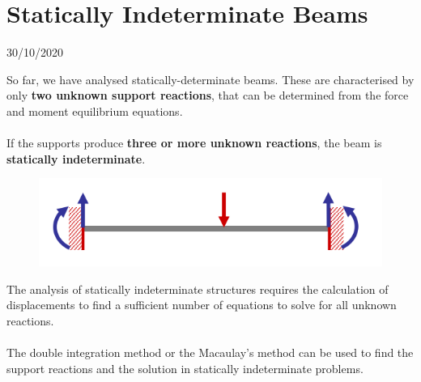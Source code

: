 \documentclass[class=report, crop=false, 12pt,a4paper]{standalone}
\begin{document}
\section{Statically Indeterminate Beams}
\begin{center}
  30/10/2020
\end{center}
So far, we have analysed statically-determinate beams. These are characterised by only \textbf{two unknown support reactions}, that can be determined from the force and moment equilibrium equations. \\\\
If the supports produce \textbf{three or more unknown reactions}, the beam is \textbf{statically indeterminate}.
\begin{figure}[H]
  \centering
  \includegraphics[width = 0.8 \textwidth]{../img/beam11.PNG}
\end{figure}
The analysis of statically indeterminate structures requires the calculation of displacements to find a sufficient number of equations to solve for all unknown reactions. \\\\
The double integration method or the Macaulay’s method can be used to find the support reactions and the solution in statically indeterminate problems.
\end{document}
